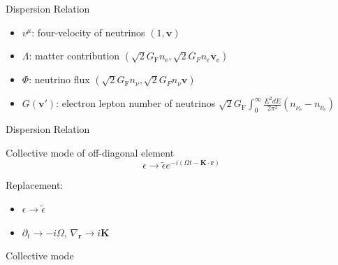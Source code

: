 \documentclass[9pt]{beamer}
\begin{document}
\begin{darkframes}
\begin{frame}{Dispersion Relation}


\pause

\begin{itemize}
    \item \colorbox{blue!50}{$ v^\mu$}:  four-velocity of neutrinos $(1, \boldsymbol v) $
    \item \colorbox{red!50}{$\Lambda$}: matter contribution $( \sqrt{2}G_{\mathrm F} n_{\mathrm e}, \sqrt{2}G_F n_e \boldsymbol v_{\mathrm e} )$
    \item \colorbox{ao!60}{$\Phi$}: neutrino flux $( \sqrt{2}G_{\mathrm F} n_{\nu}, \sqrt{2}G_F n_\nu \boldsymbol v )$
    \item \colorbox{armygreen!70}{$G(\boldsymbol{v}')$}: electron lepton number of neutrinos $\sqrt{2}G_{\mathrm F} \int_0^\infty \frac{E^2 dE}{2\pi^2} \left( n_{\nu_{\mathrm e}} - n_{\bar\nu_{\mathrm e}} \right)$
\end{itemize}



\end{frame}

\begin{frame}{Dispersion Relation}

\begin{tcolorbox}[standard jigsaw, opacityback=0]
    \color{white}
    Collective mode of off-diagonal element
\begin{equation*}
    \epsilon \to \tilde \epsilon e^{-i(\Omega t - \boldsymbol{ K}\cdot \boldsymbol{r} )}
\end{equation*}
\end{tcolorbox}

\pause

Replacement:
\begin{itemize}
    \item $\epsilon \to \tilde \epsilon$
    \item $\partial_t \to -i\Omega$, $\nabla_{\boldsymbol{r}}\to i \boldsymbol{K}$
\end{itemize}

\pause

\begin{tcolorbox}[standard jigsaw, opacityback=0]
    \color{white}
Collective mode


\end{tcolorbox}
\end{frame}
\end{darkframes}
\end{document}
